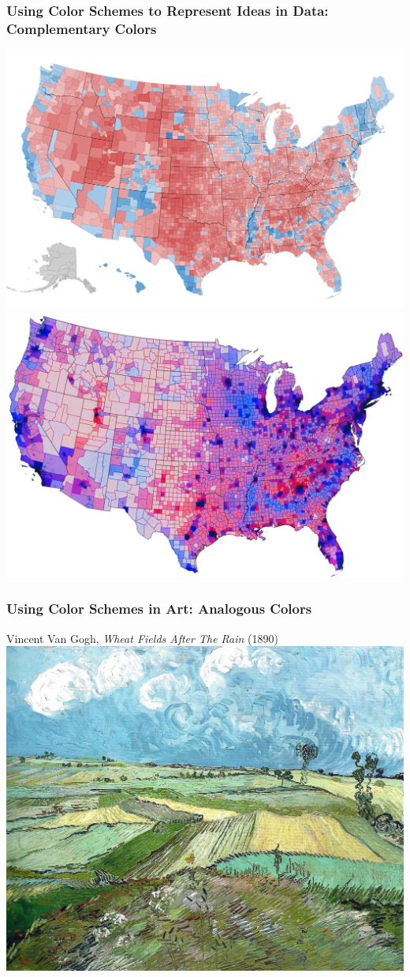 \documentclass{beamer} %
\begin{document}
\begin{frame}\frametitle{Using Color Schemes to Represent Ideas in Data:  Complementary Colors}
	\centering
	
	\includegraphics[width=0.51\linewidth]{election.png}\\
	\includegraphics[width=0.51\linewidth]{election.jpg}
	
\end{frame}


\begin{frame}\frametitle{Using Color Schemes in Art: Analogous Colors}
	\centering
	
	Vincent Van Gogh, \emph{Wheat Fields After The Rain} (1890)\\
	
	\includegraphics[width=0.87\linewidth]{vangogh}
	
\end{frame}
\end{document}
